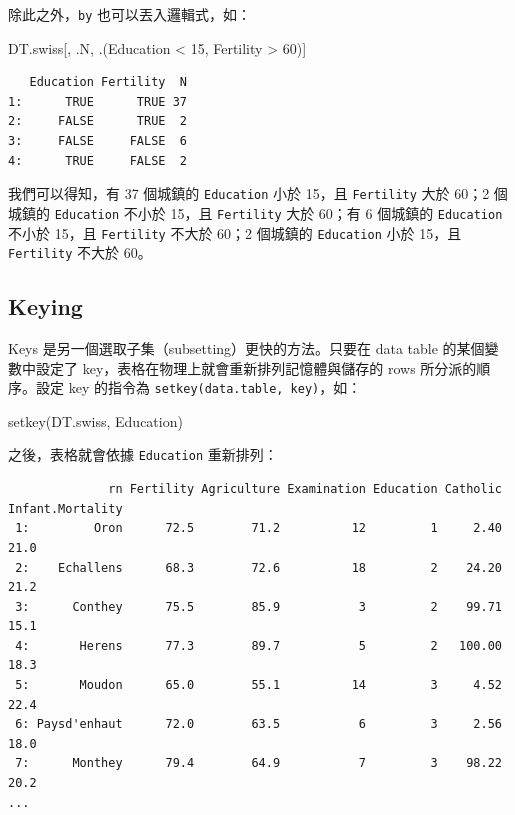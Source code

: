 \documentclass[
]{book}
\newenvironment{Shaded}{\begin{snugshade}}{\end{snugshade}}
\newcommand{\DecValTok}[1]{\textcolor[rgb]{0.00,0.00,0.81}{#1}}
\newcommand{\FunctionTok}[1]{\textcolor[rgb]{0.00,0.00,0.00}{#1}}
\newcommand{\NormalTok}[1]{#1}
\newcommand{\SpecialCharTok}[1]{\textcolor[rgb]{0.00,0.00,0.00}{#1}}
\theoremstyle{definition}
\theoremstyle{remark}
\begin{document}
除此之外，\texttt{by} 也可以丟入邏輯式，如：

\begin{Shaded}
\begin{Highlighting}[]
\NormalTok{DT.swiss[, .N, .(Education }\SpecialCharTok{\textless{}} \DecValTok{15}\NormalTok{, Fertility }\SpecialCharTok{\textgreater{}} \DecValTok{60}\NormalTok{)]}
\end{Highlighting}
\end{Shaded}

\begin{verbatim}
   Education Fertility  N
1:      TRUE      TRUE 37
2:     FALSE      TRUE  2
3:     FALSE     FALSE  6
4:      TRUE     FALSE  2
\end{verbatim}

我們可以得知，有 37 個城鎮的 \texttt{Education} 小於 15，且 \texttt{Fertility} 大於 60；2 個城鎮的 \texttt{Education} 不小於 15，且 \texttt{Fertility} 大於 60；有 6 個城鎮的 \texttt{Education} 不小於 15，且 \texttt{Fertility} 不大於 60；2 個城鎮的 \texttt{Education} 小於 15，且 \texttt{Fertility} 不大於 60。

\hypertarget{keying}{%
\subsection{Keying}\label{keying}}

Keys 是另一個選取子集（subsetting）更快的方法。只要在 data table 的某個變數中設定了 key，表格在物理上就會重新排列記憶體與儲存的 rows 所分派的順序。設定 key 的指令為 \texttt{setkey(data.table,\ key)}，如：

\begin{Shaded}
\begin{Highlighting}[]
\FunctionTok{setkey}\NormalTok{(DT.swiss, Education)}
\end{Highlighting}
\end{Shaded}

之後，表格就會依據 \texttt{Education} 重新排列：

\begin{verbatim}
              rn Fertility Agriculture Examination Education Catholic Infant.Mortality
 1:         Oron      72.5        71.2          12         1     2.40             21.0
 2:    Echallens      68.3        72.6          18         2    24.20             21.2
 3:      Conthey      75.5        85.9           3         2    99.71             15.1
 4:       Herens      77.3        89.7           5         2   100.00             18.3
 5:       Moudon      65.0        55.1          14         3     4.52             22.4
 6: Paysd'enhaut      72.0        63.5           6         3     2.56             18.0
 7:      Monthey      79.4        64.9           7         3    98.22             20.2
...
\end{verbatim}
\end{document}
